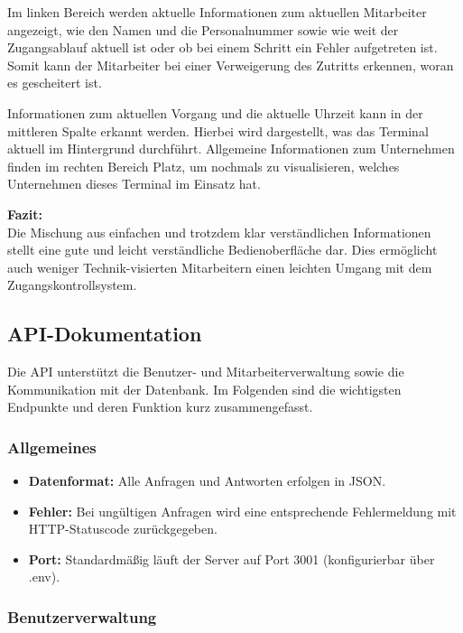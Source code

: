 \vspace{1em}
\noindent Im linken Bereich werden aktuelle Informationen zum aktuellen Mitarbeiter angezeigt, wie den Namen und die Personalnummer sowie wie weit der Zugangsablauf aktuell ist oder ob bei einem Schritt ein Fehler aufgetreten ist. Somit kann der Mitarbeiter bei einer Verweigerung des Zutritts erkennen, woran es gescheitert ist.

\vspace{1em}
\noindent Informationen zum aktuellen Vorgang und die aktuelle Uhrzeit kann in der mittleren Spalte erkannt werden. Hierbei wird dargestellt, was das Terminal aktuell im Hintergrund durchführt.
Allgemeine Informationen zum Unternehmen finden im rechten Bereich Platz, um nochmals zu visualisieren, welches Unternehmen dieses Terminal im Einsatz hat.

\vspace{1em}
\noindent \textbf{Fazit: }\\
Die Mischung aus einfachen und trotzdem klar verständlichen Informationen stellt eine gute und leicht verständliche Bedienoberfläche dar. Dies ermöglicht auch weniger Technik-visierten Mitarbeitern einen leichten Umgang mit dem Zugangskontrollsystem.

\subsection{API-Dokumentation}\label{subsec:api-dokumentation}

Die API unterstützt die Benutzer- und Mitarbeiterverwaltung sowie die Kommunikation mit der Datenbank. Im Folgenden sind die wichtigsten Endpunkte und deren Funktion kurz zusammengefasst.


\subsubsection{Allgemeines}

\begin{itemize}
    \item \textbf{Datenformat: }Alle Anfragen und Antworten erfolgen in JSON.
    \item \textbf{Fehler: }Bei ungültigen Anfragen wird eine entsprechende Fehlermeldung mit HTTP-Statuscode zurückgegeben.
    \item \textbf{Port: }Standardmäßig läuft der Server auf Port 3001 (konfigurierbar über .env).
\end{itemize}


\subsubsection{Benutzerverwaltung}

